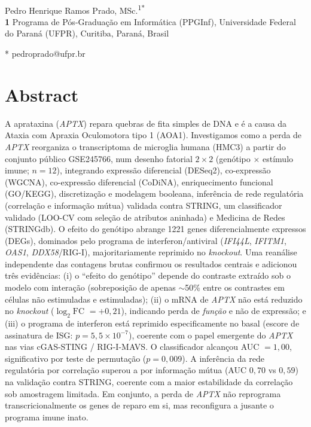 \documentclass[10pt,letterpaper]{article}
\newcommand{\gene}[1]{\textit{#1}}
\newcommand{\logfc}{\ensuremath{\log_2\mathrm{FC}}}
\begin{document}
\vspace*{0.2in}

\begin{flushleft}
{\Large
\textbf{}
}
\newline
\\
Pedro Henrique Ramos Prado, MSc.\textsuperscript{1*}
\\
\bigskip
\textbf{1} Programa de Pós-Graduação em Informática (PPGInf), Universidade Federal do Paraná (UFPR), Curitiba, Paraná, Brasil
\\
\bigskip

* pedroprado@ufpr.br

\end{flushleft}

\section*{Abstract}
A aprataxina (\gene{APTX}) repara quebras de fita simples de DNA e é a causa da
Ataxia com Apraxia Oculomotora tipo 1 (AOA1). Investigamos como a perda de
\gene{APTX} reorganiza o transcriptoma de microglia humana (HMC3) a partir do
conjunto público GSE245766, num desenho fatorial \(2\times2\)
(genótipo \(\times\) estímulo imune; \(n=12\)), integrando expressão diferencial
(DESeq2), co-expressão (WGCNA), co-expressão diferencial (CoDiNA),
enriquecimento funcional (GO/KEGG), discretização e modelagem booleana,
inferência de rede regulatória (correlação e informação mútua) validada contra
STRING, um classificador validado (LOO-CV com seleção de atributos aninhada) e
Medicina de Redes (STRINGdb).
O efeito do genótipo abrange \num{1221} genes diferencialmente expressos (DEGs),
dominados pelo programa de interferon/antiviral
(\gene{IFI44L}, \gene{IFITM1}, \gene{OAS1}, \gene{DDX58}/RIG-I),
majoritariamente reprimido no \emph{knockout}. Uma reanálise independente das
contagens brutas confirmou os resultados centrais e adicionou três evidências:
(i) o ``efeito do genótipo'' depende do contraste extraído sob o modelo com
interação (sobreposição de apenas \(\sim\)50\% entre os contrastes em células
não estimuladas e estimuladas); (ii) o mRNA de \gene{APTX} não está reduzido no
\emph{knockout} (\logfc{} \(=+0{,}21\)), indicando perda de \emph{função} e não
de expressão; e (iii) o programa de interferon está reprimido especificamente no
basal (escore de assinatura de ISG: \(p=5{,}5\times10^{-7}\)), coerente com o
papel emergente do \gene{APTX} nas vias cGAS-STING / RIG-I-MAVS. O classificador
alcançou AUC \(=1{,}00\), significativo por teste de permutação
(\(p=0{,}009\)). A inferência da rede regulatória por correlação superou a por
informação mútua (AUC \(0{,}70\) vs \(0{,}59\)) na validação contra STRING,
coerente com a maior estabilidade da correlação sob amostragem limitada. Em conjunto, a perda de \gene{APTX} não reprograma
transcricionalmente os genes de reparo em si, mas reconfigura a jusante o
programa imune inato.
\end{document}
